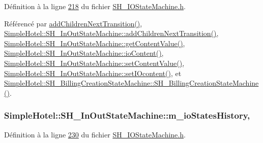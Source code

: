 Définition à la ligne \hyperlink{SH__IOStateMachine_8h_source_l00218}{218} du fichier \hyperlink{SH__IOStateMachine_8h_source}{S\-H\-\_\-\-I\-O\-State\-Machine.\-h}.



Référencé par \hyperlink{classSimpleHotel_1_1SH__LoopingInOutStateMachine_a2ac2ff43d97fd1b12e1b30d6818f33e4}{add\-Children\-Next\-Transition()}, \hyperlink{classSimpleHotel_1_1SH__InOutStateMachine_aaf5afe04d6e4d3d5ebf0b5f1b00eddf1}{Simple\-Hotel\-::\-S\-H\-\_\-\-In\-Out\-State\-Machine\-::add\-Children\-Next\-Transition()}, \hyperlink{classSimpleHotel_1_1SH__InOutStateMachine_a4e2afab69163c7ce53dd6a40c793d5dc}{Simple\-Hotel\-::\-S\-H\-\_\-\-In\-Out\-State\-Machine\-::get\-Content\-Value()}, \hyperlink{classSimpleHotel_1_1SH__InOutStateMachine_a378618937520bc65b6e25cd187a92aad}{Simple\-Hotel\-::\-S\-H\-\_\-\-In\-Out\-State\-Machine\-::io\-Content()}, \hyperlink{classSimpleHotel_1_1SH__InOutStateMachine_aaf92da452f6cf7cc57aa9e60f88322e4}{Simple\-Hotel\-::\-S\-H\-\_\-\-In\-Out\-State\-Machine\-::set\-Content\-Value()}, \hyperlink{classSimpleHotel_1_1SH__InOutStateMachine_a60245aa45ba2b9720965412774e123fb}{Simple\-Hotel\-::\-S\-H\-\_\-\-In\-Out\-State\-Machine\-::set\-I\-Ocontent()}, et \hyperlink{classSimpleHotel_1_1SH__BillingCreationStateMachine_a8c7d39e11d0ced1fd9c27a5550465b86}{Simple\-Hotel\-::\-S\-H\-\_\-\-Billing\-Creation\-State\-Machine\-::\-S\-H\-\_\-\-Billing\-Creation\-State\-Machine()}.

\hypertarget{classSimpleHotel_1_1SH__InOutStateMachine_a45a7defb15e50a196bc471017fc86eb4}{
\subsubsection[{m\-\_\-io\-States\-History}]{\setlength{\rightskip}{0pt plus 5cm}Simple\-Hotel\-::\-S\-H\-\_\-\-In\-Out\-State\-Machine\-::m\-\_\-io\-States\-History\hspace{0.3cm}{\ttfamily [protected]}, {\ttfamily [inherited]}}}\label{classSimpleHotel_1_1SH__InOutStateMachine_a45a7defb15e50a196bc471017fc86eb4}


Définition à la ligne \hyperlink{SH__IOStateMachine_8h_source_l00230}{230} du fichier \hyperlink{SH__IOStateMachine_8h_source}{S\-H\-\_\-\-I\-O\-State\-Machine.\-h}.



